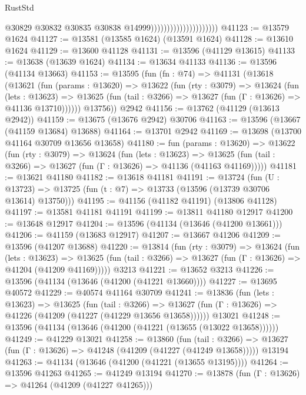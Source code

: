 \begin{lexlean}{RustStd}
\begin{coremodule}
                                              @30829
                                              @30832
                                              @30835
                                              @30838
                                              @14999)))))))))))))))))))))
@41123 := @13579 @1624
@41127 := @13581 (@13585 @1624) (@13591 @1624)
@41128 := @13610 @1624
@41129 := @13600 @41128
@41131 := @13596 (@41129 @13615)
@41133 := @13638 (@13639 @1624)
@41134 := @13634 @41133
@41136 := @13596 (@41134 @13663)
@41153 := @13595
    (fun (fn : @74) =>
    @41131
      (@13618
        (@13621
          (fun (params : @13620) =>
          @13622
            (fun (rty : @3079) =>
            @13624
              (fun (lets : @13623) =>
              @13625 (fun (tail : @3266) => @13627 (fun (Γ : @13626) => @41136 @13710))))))
        @13756))
    @2942
@41156 := @13762 (@41129 (@13613 @2942))
@41159 := @13675 (@13676 @2942) @30706
@41163 := @13596 (@13667 (@41159 @13684) @13688)
@41164 := @13701 @2942
@41169 := @13698 (@13700 @41164 @30709 @13656 @13658)
@41180 := fun (params : @13620) =>
  @13622
    (fun (rty : @3079) =>
    @13624
      (fun (lets : @13623) =>
      @13625 (fun (tail : @3266) => @13627 (fun (Γ : @13626) => @41136 (@41163 @41169)))))
@41181 := @13621 @41180
@41182 := @13618 @41181
@41191 := @13724
    (fun (U : @13723) => @13725 (fun (t : @7) => @13733 (@13596 (@13739 @30706 @13614) @13750)))
@41195 := @41156 (@41182 @41191) (@13806 @41128)
@41197 := @13581 @41181 @41191
@41199 := @13811 @41180 @12917
@41200 := @13648 @12917
@41204 := @13596 (@41134 (@13646 (@41200 @13661)))
@41206 := @41159 (@13683 @12917)
@41207 := @13667 @41206
@41209 := @13596 (@41207 @13688)
@41220 := @13814
    (fun (rty : @3079) =>
    @13624
      (fun (lets : @13623) =>
      @13625 (fun (tail : @3266) => @13627 (fun (Γ : @13626) => @41204 (@41209 @41169)))))
    @3213
@41221 := @13652 @3213
@41226 := @13596 (@41134 (@13646 (@41200 (@41221 @13660))))
@41227 := @13695 @40572
@41229 := @40574 @41164 @30709
@41241 := @13836
    (fun (lets : @13623) =>
    @13625
      (fun (tail : @3266) =>
      @13627 (fun (Γ : @13626) => @41226 (@41209 (@41227 (@41229 @13656 @13658))))))
    @13021
@41248 := @13596 (@41134 (@13646 (@41200 (@41221 (@13655 (@13022 @13658))))))
@41249 := @41229 @13021
@41258 := @13860
    (fun (tail : @3266) => @13627 (fun (Γ : @13626) => @41248 (@41209 (@41227 (@41249 @13658)))))
    @13194
@41263 := @41134 (@13646 (@41200 (@41221 (@13655 @13195))))
@41264 := @13596 @41263
@41265 := @41249 @13194
@41270 := @13878 (fun (Γ : @13626) => @41264 (@41209 (@41227 @41265)))

\end{coremodule}
\end{lexlean}

